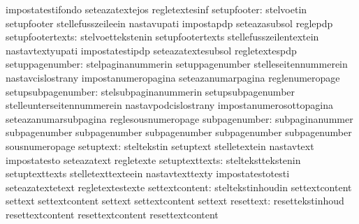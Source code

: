                                   impostatestifondo                seteazatextejos
                                  regletextesinf
                     setupfooter: stelvoetin                       setupfooter
                                  stellefusszeileein               nastavupati
                                  impostapdp                       seteazasubsol
                                  reglepdp
                setupfootertexts: stelvoettekstenin                setupfootertexts
                                  stellefusszeilentextein          nastavtextyupati
                                  impostatestipdp                  seteazatextesubsol
                                  regletextespdp
                 setuppagenumber: stelpaginanummerin               setuppagenumber
                                  stelleseitennummerein            nastavcislostrany
                                  impostanumeropagina              seteazanumarpagina
                                  reglenumeropage
              setupsubpagenumber: stelsubpaginanummerin            setupsubpagenumber
                                  stelleunterseitennummerein       nastavpodcislostrany
                                  impostanumerosottopagina         seteazanumarsubpagina
                                  reglesousnumeropage
                   subpagenumber: subpaginanummer                  subpagenumber
                                  subpagenumber                    subpagenumber
                                  subpagenumber                    subpagenumber
                                  sousnumeropage
                       setuptext: steltekstin                      setuptext
                                  stelletextein                    nastavtext
                                  impostatesto                     seteazatext
                                  regletexte
                  setuptexttexts: stelteksttekstenin               setuptexttexts
                                  stelletexttexteein               nastavtexttexty
                                  impostatestotesti                seteazatextetext
                                  regletextestexte
                  settextcontent: steltekstinhoudin                settextcontent
                                  settext                          settextcontent
                                  settext                          settextcontent
                                  settext
                       resettext: resettekstinhoud                 resettextcontent
                                  resettextcontent                 resettextcontent
